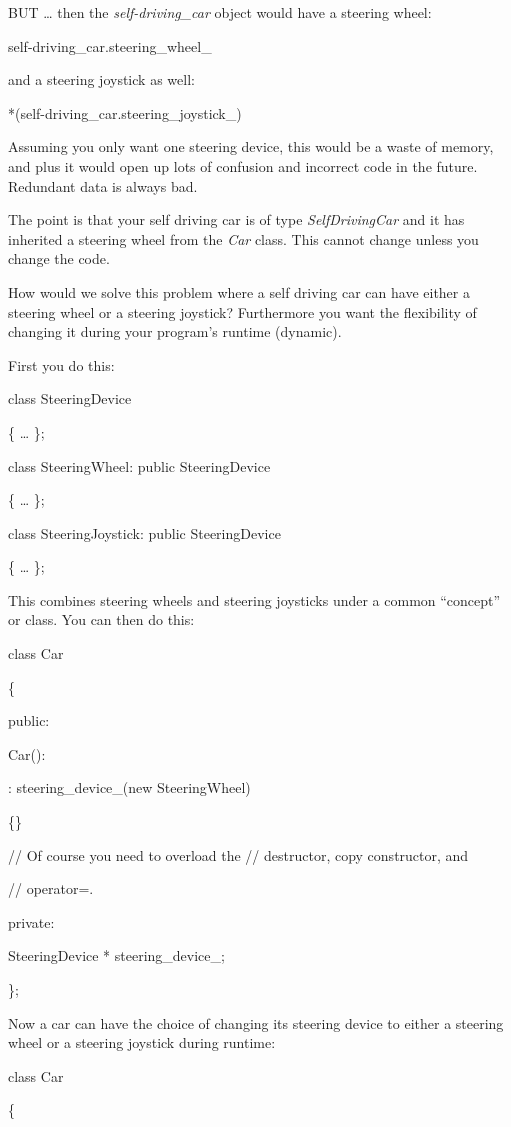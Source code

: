 \documentclass[
]{article}
\begin{document}
BUT \ldots{} then the \emph{self-driving\_car} object would have a
steering wheel:

self-driving\_car.steering\_wheel\_

and a steering joystick as well:

*(self-driving\_car.steering\_joystick\_)

Assuming you only want one steering device, this would be a waste of
memory, and plus it would open up lots of confusion and incorrect code
in the future. Redundant data is always bad.

The point is that your self driving car is of type \emph{SelfDrivingCar}
and it has inherited a steering wheel from the \emph{Car} class. This
cannot change unless you change the code.

How would we solve this problem where a self driving car can have either
a steering wheel or a steering joystick? Furthermore you want the
flexibility of changing it during your program's runtime (dynamic).

First you do this:

class SteeringDevice

\{ \ldots{} \};

class SteeringWheel: public SteeringDevice

\{ \ldots{} \};

class SteeringJoystick: public SteeringDevice

\{ \ldots{} \};

This combines steering wheels and steering joysticks under a common
``concept'' or class. You can then do this:

class Car

\{

public:

Car():

: steering\_device\_(new SteeringWheel)

\{\}

// Of course you need to overload the // destructor, copy constructor,
and

// operator=.

private:

SteeringDevice * steering\_device\_;

\};

Now a car can have the choice of changing its steering device to either
a steering wheel or a steering joystick during runtime:

class Car

\{
\end{document}
